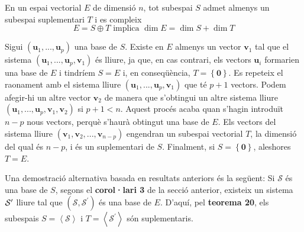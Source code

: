 \begin{teorema}
\label{teorema21}En un espai vectorial $E$ de dimensió $n$,
tot subespai $S$ admet almenys un subespai suplementari $%
T$ i es compleix%
\begin{equation*}
E=S\oplus T\text{ \ \ implica \ \ }\dim E%
=\dim S+\dim T
\end{equation*}

\end{teorema}
\begin{prova}
Sigui $(\mathbf{u}_{1},...,\mathbf{u}_{p})$ una base de $S$. Existe
en $E$ almenys un vector $\mathbf{v}_{1}$ tal que el sistema $(%
\mathbf{u}_{1},...,\mathbf{u}_{p},\mathbf{v}_{1})$ és lliure, ja que, en cas
contrari, els vectors $\mathbf{u}_{i}$ formarien una base de $E$ i tindríem $S=E$ i, en conseqüència, $T%
=\left\{ \mathbf{0}\right\} $. Es repeteix el raonament amb el sistema
lliure $(\mathbf{u}_{1},...,\mathbf{u}_{p},\mathbf{v}_{1})$ que té $p+1$
vectors. Podem afegir-hi un altre vector $\mathbf{v}_{2}$ de manera que s'obtingui un altre sistema lliure $(\mathbf{u}_{1},...,\mathbf{u}_{p},\mathbf{v}%
_{1},\mathbf{v}_{2})$ si $p+1<n$. Aquest procés acaba quan s'hagin
introduït $n-p$ nous vectors, perquè s'haurà obtingut una base de $%
E$. Els vectors del sistema lliure $\left( \mathbf{v}_{1},\mathbf{v}%
_{2},...,\mathbf{v}_{n-p}\right) $ engendran un subespai vectorial $%
T$, la dimensió del qual és $n-p$, i és un suplementari de $S$. Finalment, si $S=\left\{ \mathbf{0}\right\} $, aleshores $%
T=E$.
\end{prova}

\begin{observacio}
Una demostració alternativa basada en resultats anteriors és la
següent: Si $\mathcal{S}$ és una base de $S$, segons el 
\textbf{corol·lari 3} de la secció anterior, existeix un sistema $\mathcal{%
S}^{\prime }$ lliure tal que $(\mathcal{S},\mathcal{S}^{\prime })$ és una
base de $E$. D’aquí, pel \textbf{teorema 20}, els
subespais $S=\left\langle \mathcal{S}\right\rangle $ i $T%
=\left\langle \mathcal{S}^{\prime }\right\rangle $ són suplementaris.
\end{observacio}

